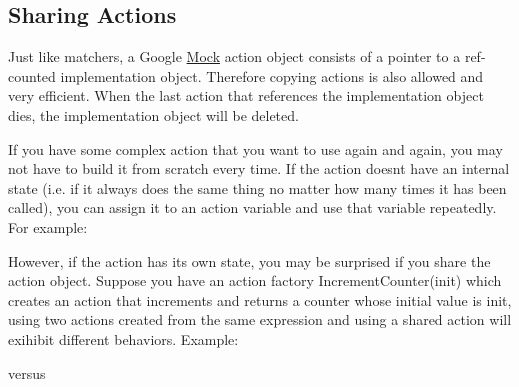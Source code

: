 \subsection*{Sharing Actions}

Just like matchers, a Google \mbox{\hyperlink{class_mock}{Mock}} action object consists of a pointer to a ref-\/counted implementation object. Therefore copying actions is also allowed and very efficient. When the last action that references the implementation object dies, the implementation object will be deleted.

If you have some complex action that you want to use again and again, you may not have to build it from scratch every time. If the action doesn\textquotesingle{}t have an internal state (i.\+e. if it always does the same thing no matter how many times it has been called), you can assign it to an action variable and use that variable repeatedly. For example\+:


\begin{DoxyCode}{0}
\end{DoxyCode}


However, if the action has its own state, you may be surprised if you share the action object. Suppose you have an action factory {\ttfamily Increment\+Counter(init)} which creates an action that increments and returns a counter whose initial value is {\ttfamily init}, using two actions created from the same expression and using a shared action will exihibit different behaviors. Example\+:


\begin{DoxyCode}{0}
\end{DoxyCode}


versus


\begin{DoxyCode}{0}
\DoxyCodeLine{}
\end{DoxyCode}


